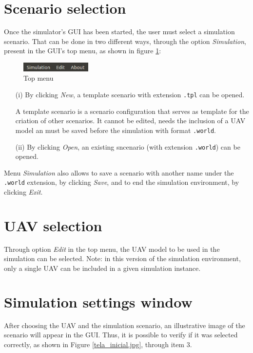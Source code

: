 \section{Scenario selection}

Once the simulator's GUI has been started, the user must select a simulation scenario. That can be done in two different ways, through the option \textit{Simulation}, present in the GUI's top menu, as shown in figure \ref{2}:

\begin{figure}[!ht]
	\centering
	\includegraphics[width=100pt]{figuras/2.png}
	\caption{Top menu}
	\label{2}
\end{figure}

\begin{itemize}
	\item[(i)] By clicking \textit{New}, a template scenario with extension \texttt{.tpl} can be opened.

	A template scenario is a scenario configuration that serves as template for the criation of other scenarios. It cannot be edited, needs the inclusion of a UAV model an must be saved before the simulation with format \texttt{.world}.
	 
	\item[(ii)] By clicking \textit{Open}, an existing sncenario (with extension \texttt{.world}) can be opened.
\end{itemize}

Menu \textit{Simulation} also allows to save a scenario with another name under the \texttt{.world} extension, by clicking \textit{Save}, and to end the simulation environment, by clicking \textit{Exit}.

\section{UAV selection}

Through option \textit{Edit} in the top menu, the UAV model to be used in the simulation can be selected. Note: in this version of the simulation environment, only a single UAV can be included in a given simulation instance.

\section{Simulation settings window}

After choosing the UAV and the simulation scenario, an illustrative image of the scenario will appear in the GUI. Thus, it is possible to verify if it was selected correctly, as shown in Figure \ref{tela_inicial.jpg}, through item 3.

